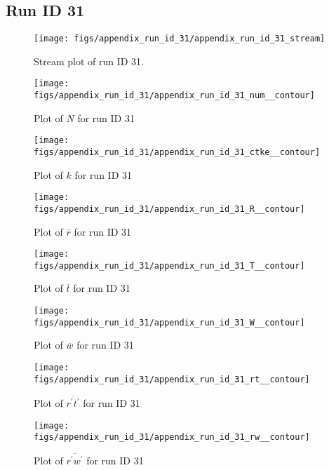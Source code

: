 \subsection{Run ID 31}
\begin{figure}[H]
\centering
\texttt{[image: figs/appendix\_run\_id\_31/appendix\_run\_id\_31\_stream]}
\caption{Stream plot of run ID 31.}
\label{fig:appendix_run_id_31_stream}
\end{figure}


\begin{figure}[H]
\centering
\texttt{[image: figs/appendix\_run\_id\_31/appendix\_run\_id\_31\_num\_\_contour]}
\caption{Plot of $N$ for run ID 31}
\label{fig:appendix_run_id_31_num__contour}
\end{figure}


\begin{figure}[H]
\centering
\texttt{[image: figs/appendix\_run\_id\_31/appendix\_run\_id\_31\_ctke\_\_contour]}
\caption{Plot of $k$ for run ID 31}
\label{fig:appendix_run_id_31_ctke__contour}
\end{figure}


\begin{figure}[H]
\centering
\texttt{[image: figs/appendix\_run\_id\_31/appendix\_run\_id\_31\_R\_\_contour]}
\caption{Plot of $\overline{r}$ for run ID 31}
\label{fig:appendix_run_id_31_R__contour}
\end{figure}


\begin{figure}[H]
\centering
\texttt{[image: figs/appendix\_run\_id\_31/appendix\_run\_id\_31\_T\_\_contour]}
\caption{Plot of $\overline{t}$ for run ID 31}
\label{fig:appendix_run_id_31_T__contour}
\end{figure}


\begin{figure}[H]
\centering
\texttt{[image: figs/appendix\_run\_id\_31/appendix\_run\_id\_31\_W\_\_contour]}
\caption{Plot of $\overline{w}$ for run ID 31}
\label{fig:appendix_run_id_31_W__contour}
\end{figure}


\begin{figure}[H]
\centering
\texttt{[image: figs/appendix\_run\_id\_31/appendix\_run\_id\_31\_rt\_\_contour]}
\caption{Plot of $\overline{r^\prime t^\prime}$ for run ID 31}
\label{fig:appendix_run_id_31_rt__contour}
\end{figure}


\begin{figure}[H]
\centering
\texttt{[image: figs/appendix\_run\_id\_31/appendix\_run\_id\_31\_rw\_\_contour]}
\caption{Plot of $\overline{r^\prime w^\prime}$ for run ID 31}
\label{fig:appendix_run_id_31_rw__contour}
\end{figure}


